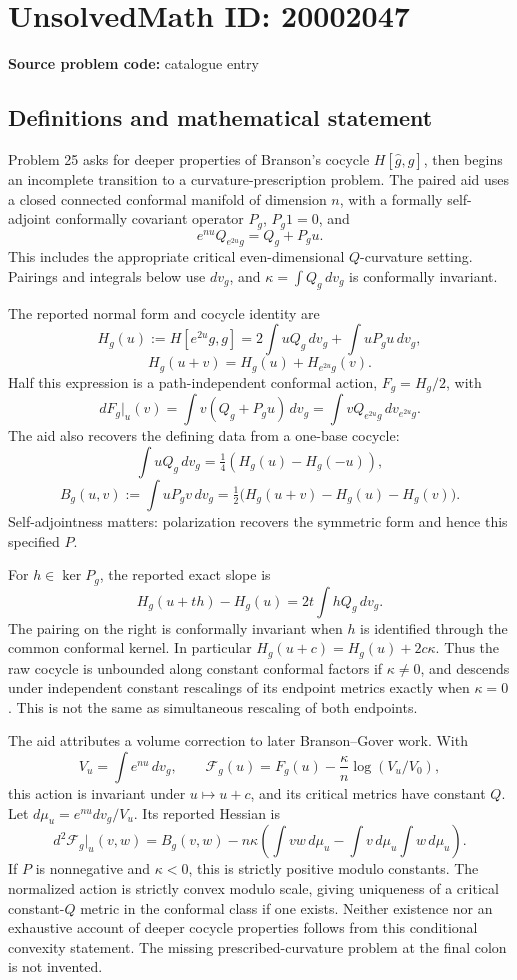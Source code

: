 \documentclass[11pt]{article}
\begin{document}
\section*{UnsolvedMath ID: 20002047}
\textbf{Source problem code:} catalogue entry
\subsection{Definitions and mathematical statement}
Problem 25 asks for deeper properties of Branson's cocycle \(H[\widehat g,g]\), then begins an incomplete transition to a curvature-prescription problem. The paired aid uses a closed connected conformal manifold of dimension \(n\), with a formally self-adjoint conformally covariant operator \(P_g\), \(P_g1=0\), and
\[
 e^{nu}Q_{e^{2u}g}=Q_g+P_gu.
\]
This includes the appropriate critical even-dimensional \(Q\)-curvature setting. Pairings and integrals below use \(dv_g\), and \(\kappa=\int Q_g\,dv_g\) is conformally invariant.

The reported normal form and cocycle identity are
\[
 H_g(u):=H[e^{2u}g,g]=2\int uQ_g\,dv_g+\int uP_gu\,dv_g,
\]
\[
 H_g(u+v)=H_g(u)+H_{e^{2u}g}(v).
\]
Half this expression is a path-independent conformal action, \(F_g=H_g/2\), with
\[
 dF_g|_u(v)=\int v(Q_g+P_gu)\,dv_g
           =\int vQ_{e^{2u}g}\,dv_{e^{2u}g}.
\]
The aid also recovers the defining data from a one-base cocycle:
\[
 \int uQ_g\,dv_g=\tfrac14(H_g(u)-H_g(-u)),
\]
\[
 B_g(u,v):=\int uP_gv\,dv_g
   =\tfrac12\bigl(H_g(u+v)-H_g(u)-H_g(v)\bigr).
\]
Self-adjointness matters: polarization recovers the symmetric form and hence this specified \(P\).

For \(h\in\ker P_g\), the reported exact slope is
\[
 H_g(u+th)-H_g(u)=2t\int hQ_g\,dv_g.
\]
The pairing on the right is conformally invariant when \(h\) is identified through the common conformal kernel. In particular \(H_g(u+c)=H_g(u)+2c\kappa\). Thus the raw cocycle is unbounded along constant conformal factors if \(\kappa\ne0\), and descends under independent constant rescalings of its endpoint metrics exactly when \(\kappa=0\). This is not the same as simultaneous rescaling of both endpoints.

The aid attributes a volume correction to later Branson--Gover work. With
\[
 V_u=\int e^{nu}\,dv_g,\qquad
 \mathcal F_g(u)=F_g(u)-\frac\kappa n\log(V_u/V_0),
\]
this action is invariant under \(u\mapsto u+c\), and its critical metrics have constant \(Q\). Let \(d\mu_u=e^{nu}dv_g/V_u\). Its reported Hessian is
\[
 d^2\mathcal F_g|_u(v,w)=B_g(v,w)
 -n\kappa\left(\int vw\,d\mu_u
               -\int v\,d\mu_u\int w\,d\mu_u\right).
\]
If \(P\) is nonnegative and \(\kappa<0\), this is strictly positive modulo constants. The normalized action is strictly convex modulo scale, giving uniqueness of a critical constant-\(Q\) metric in the conformal class if one exists. Neither existence nor an exhaustive account of deeper cocycle properties follows from this conditional convexity statement. The missing prescribed-curvature problem at the final colon is not invented.
\end{document}
